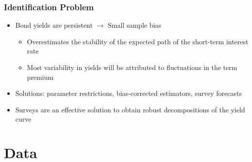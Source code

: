 \documentclass[12pt, aspectratio=169, xcolor=dvipsnames]{beamer} 			         %
\begin{document}
\begin{frame}
	\frametitle{Identification Problem}
	\begin{itemize}
		\item Bond yields are persistent $\rightarrow$ Small sample bias \citep{KimOrphanides:2012}
		\begin{itemize}
			\item Overestimates the stability of the expected path of the short-term interest rate
			\item Most variability in yields will be attributed to fluctuations in the term premium
		\end{itemize}
	\item Solutions: parameter restrictions, bias-corrected estimators, survey forecasts
	\item Surveys are an effective solution to obtain robust decompositions of the yield curve \citep{Guimaraes:2014} 
	\end{itemize}
\end{frame}


\section{Data}
\end{document}
